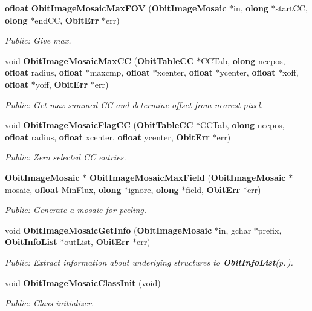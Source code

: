 \begin{CompactItemize}
{\bf ofloat} {\bf Obit\-Image\-Mosaic\-Max\-FOV} ({\bf Obit\-Image\-Mosaic} $\ast$in, {\bf olong} $\ast$start\-CC, {\bf olong} $\ast$end\-CC, {\bf Obit\-Err} $\ast$err)
\begin{CompactList}\small\item\em Public: Give max. \item\end{CompactList}\item 
void {\bf Obit\-Image\-Mosaic\-Max\-CC} ({\bf Obit\-Table\-CC} $\ast$CCTab, {\bf olong} nccpos, {\bf ofloat} radius, {\bf ofloat} $\ast$maxcmp, {\bf ofloat} $\ast$xcenter, {\bf ofloat} $\ast$ycenter, {\bf ofloat} $\ast$xoff, {\bf ofloat} $\ast$yoff, {\bf Obit\-Err} $\ast$err)
\begin{CompactList}\small\item\em Public: Get max summed CC and determine offset from nearest pixel. \item\end{CompactList}\item 
void {\bf Obit\-Image\-Mosaic\-Flag\-CC} ({\bf Obit\-Table\-CC} $\ast$CCTab, {\bf olong} nccpos, {\bf ofloat} radius, {\bf ofloat} xcenter, {\bf ofloat} ycenter, {\bf Obit\-Err} $\ast$err)
\begin{CompactList}\small\item\em Public: Zero selected CC entries. \item\end{CompactList}\item 
{\bf Obit\-Image\-Mosaic} $\ast$ {\bf Obit\-Image\-Mosaic\-Max\-Field} ({\bf Obit\-Image\-Mosaic} $\ast$mosaic, {\bf ofloat} Min\-Flux, {\bf olong} $\ast$ignore, {\bf olong} $\ast$field, {\bf Obit\-Err} $\ast$err)
\begin{CompactList}\small\item\em Public: Generate a mosaic for peeling. \item\end{CompactList}\item 
void {\bf Obit\-Image\-Mosaic\-Get\-Info} ({\bf Obit\-Image\-Mosaic} $\ast$in, gchar $\ast$prefix, {\bf Obit\-Info\-List} $\ast$out\-List, {\bf Obit\-Err} $\ast$err)
\begin{CompactList}\small\item\em Public: Extract information about underlying structures to {\bf Obit\-Info\-List}{\rm (p.\,\pageref{structObitInfoList})}. \item\end{CompactList}\item 
void {\bf Obit\-Image\-Mosaic\-Class\-Init} (void)
\begin{CompactList}\small\item\em Public: Class initializer. \item\end{CompactList}\end{CompactItemize}


